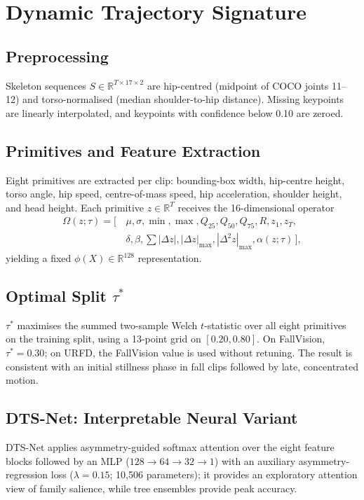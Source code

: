 \section{Dynamic Trajectory Signature}
\subsection{Preprocessing}
Skeleton sequences $S\in\mathbb{R}^{T\times17\times2}$ are hip-centred (midpoint of COCO joints 11--12) and torso-normalised (median shoulder-to-hip distance). Missing keypoints are linearly interpolated, and keypoints with confidence below 0.10 are zeroed.

\subsection{Primitives and Feature Extraction}
Eight primitives are extracted per clip: bounding-box width, hip-centre height, torso angle, hip speed, centre-of-mass speed, hip acceleration, shoulder height, and head height. Each primitive $z\in\mathbb{R}^{T}$ receives the 16-dimensional operator
\begin{align*}
\Omega(z;\tau)=[\,&\mu,\sigma,\min,\max,Q_{25},Q_{50},Q_{75},R,z_1,z_T,\\
&\delta,\beta,\textstyle\sum|\Delta z|,|\Delta z|_{\max},|\Delta^2 z|_{\max},\alpha(z;\tau)\,],
\end{align*}
yielding a fixed $\phi(X)\in\mathbb{R}^{128}$ representation.

\subsection{Optimal Split $\tau^{*}$}
$\tau^{*}$ maximises the summed two-sample Welch $t$-statistic over all eight primitives on the training split, using a 13-point grid on $[0.20,0.80]$. On FallVision, $\tau^{*}=0.30$; on URFD, the FallVision value is used without retuning. The result is consistent with an initial stillness phase in fall clips followed by late, concentrated motion.

\subsection{DTS-Net: Interpretable Neural Variant}
DTS-Net applies asymmetry-guided softmax attention over the eight feature blocks followed by an MLP ($128{\rightarrow}64{\rightarrow}32{\rightarrow}1$) with an auxiliary asymmetry-regression loss ($\lambda=0.15$; 10,506 parameters); it provides an exploratory attention view of family salience, while tree ensembles provide peak accuracy.

